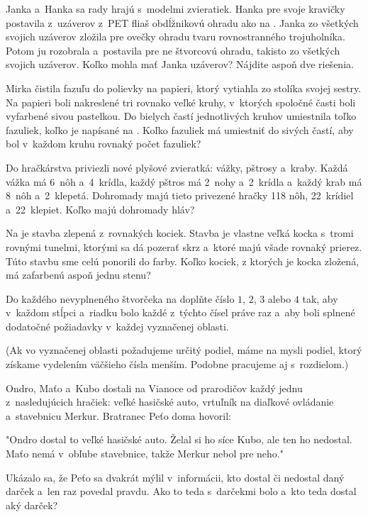 {%
Janka a~Hanka sa rady hrajú s~modelmi zvieratiek. Hanka pre svoje kravičky
postavila z~uzáverov z~PET fliaš obdĺžnikovú ohradu ako na \obr{}.
Janka zo všetkých svojich uzáverov zložila pre ovečky ohradu tvaru rovnostranného trojuholníka. Potom ju rozobrala a~postavila pre ne štvorcovú ohradu, takisto zo všetkých svojich uzáverov. Koľko mohla mať Janka uzáverov? Nájdite aspoň dve riešenia.
%
}

{%
Mirka čistila fazuľu do polievky na papieri, ktorý vytiahla zo stolíka svojej sestry.
Na papieri boli nakreslené tri rovnako veľké kruhy, v~ktorých spoločné časti boli vyfarbené sivou pastelkou. Do bielych častí jednotlivých kruhov umiestnila toľko fazuliek, koľko je napísané na \obr{}. Koľko fazuliek má umiestniť do sivých častí, aby bol v~každom kruhu rovnaký počet fazuliek?
}

{%
Do hračkárstva priviezli nové plyšové zvieratká: vážky, pštrosy a~kraby.
Každá vážka má 6~nôh a~4~krídla, každý pštros má 2~nohy a~2~krídla a~každý
krab má 8~nôh a~2~klepetá.
Dohromady majú tieto privezené hračky 118 nôh, 22~krídiel a~22~klepiet.
Koľko majú dohromady hláv?}

{%
Na \obr{} je stavba zlepená z~rovnakých kociek. Stavba je vlastne
veľká kocka s~tromi rovnými tunelmi, ktorými sa dá pozerať skrz a~ktoré majú všade
rovnaký prierez. Túto stavbu sme celú ponorili do farby.
Koľko kociek, z ktorých je kocka zložená, má zafarbenú aspoň jednu stenu?
%
}

{%
Do každého nevyplneného štvorčeka na \obr{} doplňte číslo $1$, $2$, $3$ alebo $4$ tak, aby v~každom stĺpci a~riadku bolo každé z~týchto čísel práve raz a~aby boli splnené dodatočné požiadavky v~každej vyznačenej oblasti.
%

(Ak vo vyznačenej oblasti požadujeme určitý podiel, máme na mysli podiel, ktorý získame vydelením väčšieho čísla menším. Podobne pracujeme aj s~rozdielom.)
}

{%
Ondro, Maťo a~Kubo dostali na Vianoce od prarodičov každý jednu z~nasledujúcich hračiek:
veľké hasičské auto, %
vrtuľník na diaľkové ovládanie a~stavebnicu Merkur.
Bratranec Peťo doma hovoril:

"Ondro dostal to veľké hasičské auto.
Želal si ho síce Kubo, ale ten ho nedostal.
Maťo nemá v~obľube stavebnice, takže Merkur
nebol pre neho."

Ukázalo sa, že Peťo sa dvakrát mýlil v~informácii, kto
dostal či nedostal daný darček a~len raz povedal pravdu.
Ako to teda s~darčekmi bolo a~kto teda dostal aký darček?}

